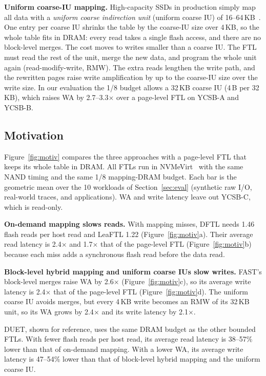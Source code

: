 \textbf{Uniform coarse-IU mapping.}
High-capacity SSDs in production simply map all data with a
\emph{uniform coarse indirection unit} (uniform coarse IU) of 16--64\,KB~\cite{micron-iu,solidigm-csal}. One entry per coarse IU
shrinks the table by the coarse-IU size over 4\,KB, so the whole table fits in DRAM:
every read takes a single flash access, and there are no block-level merges. The cost
moves to writes smaller than a coarse IU. The FTL must read the rest of the unit,
merge the new data, and program the whole unit again (read-modify-write, RMW).
The extra reads lengthen the write path, and the rewritten pages raise write
amplification by up to the coarse-IU size over the write size. In our evaluation the
1/8 budget allows a 32\,KB coarse IU (4\,B per 32\,KB), which raises WA by
2.7--3.3$\times$ over a page-level FTL on YCSB-A and YCSB-B.

\subsection{Motivation}
Figure~\ref{fig:motiv} compares the three approaches with a page-level FTL
that keeps its whole table in DRAM. All FTLs run in NVMeVirt~\cite{nvmevirt}
with the same NAND timing and the same 1/8 mapping-DRAM budget. Each bar is the
geometric mean over the 10 workloads of Section~\ref{sec:eval} (synthetic raw I/O,
real-world traces, and applications). WA and write latency leave out YCSB-C,
which is read-only.

\textbf{On-demand mapping slows reads.}
With mapping misses, DFTL needs 1.46 flash reads per host read and LeaFTL 1.22
(Figure~\ref{fig:motiv}a). Their average read latency is 2.4$\times$ and
1.7$\times$ that of the page-level FTL (Figure~\ref{fig:motiv}b) because each
miss adds a synchronous flash read before the data read.

\textbf{Block-level hybrid mapping and uniform coarse IUs slow writes.}
FAST's block-level merges raise WA by 2.6$\times$ (Figure~\ref{fig:motiv}c),
so its average write latency is 2.4$\times$ that of the page-level
FTL (Figure~\ref{fig:motiv}d). The uniform coarse IU avoids merges, but every 4\,KB write becomes an RMW of
its 32\,KB unit, so its WA grows by 2.4$\times$ and its write latency by 2.1$\times$.

DUET, shown for reference, uses the same DRAM budget as the other bounded FTLs.
With fewer flash reads per host read, its average read latency is 38--57\% lower
than that of on-demand mapping. With a lower WA, its average write latency is
47--54\% lower than that of block-level hybrid mapping and the uniform coarse IU.

